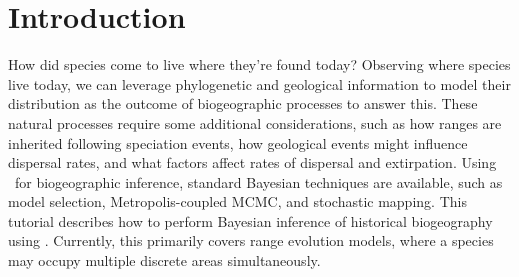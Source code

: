 \section{Introduction}

How did species come to live where they're found today?
Observing where species live today, we can leverage phylogenetic and geological information to model their distribution as the outcome of biogeographic processes to answer this.
These natural processes require some additional considerations, such as how ranges are inherited following speciation events, how geological events might influence dispersal rates, and what factors affect rates of dispersal and extirpation.
Using \RevBayes~for biogeographic inference, standard Bayesian techniques are available, such as model selection, Metropolis-coupled MCMC, and stochastic mapping.
This tutorial describes how to perform Bayesian inference of historical biogeography using \RevBayes. 
Currently, this primarily covers range evolution models, where a species may occupy multiple discrete areas simultaneously.

%
%
%
%
%
%
%
%
%
%

%

%

